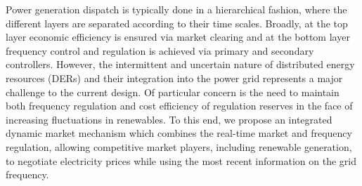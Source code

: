 \documentclass[journal]{IEEEtran}
\newcommand{\1}{\mathds 1}
\theoremstyle{remark}
\theoremstyle{definition}
\begin{document}

Power generation dispatch is typically done in a hierarchical fashion,
where the different layers are separated according to their time
scales. Broadly, at the top layer economic efficiency is ensured via
market clearing and at the bottom layer frequency control and
regulation is achieved via primary and secondary controllers. However,
the intermittent and uncertain nature of distributed energy resources
(DERs) and their integration into the power grid represents a major
challenge to the current design. Of particular concern is the need to
maintain both frequency regulation and cost efficiency of regulation
reserves in the face of increasing fluctuations in renewables. To this
end, we propose an integrated dynamic market mechanism which combines
the real-time market and frequency regulation, allowing competitive
market players, including renewable generation, to negotiate
electricity prices while using the most recent information on the grid
frequency.
\end{document}
